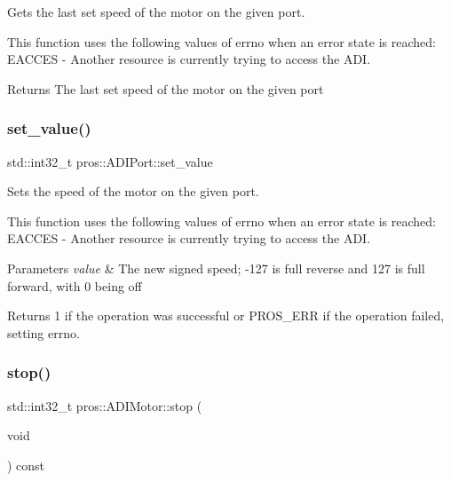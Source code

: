 Gets the last set speed of the motor on the given port. 

This function uses the following values of errno when an error state is reached\+: E\+A\+C\+C\+ES -\/ Another resource is currently trying to access the A\+DI.

\begin{DoxyReturn}{Returns}
The last set speed of the motor on the given port 
\end{DoxyReturn}
\mbox{\label{classpros_1_1ADIMotor_ae6711117fbceb3bb6e3602c4ef63aff1}} 
\subsubsection{\texorpdfstring{set\_value()}{set\_value()}}
{\footnotesize\ttfamily std\+::int32\+\_\+t pros\+::\+A\+D\+I\+Port\+::set\+\_\+value}



Sets the speed of the motor on the given port. 

This function uses the following values of errno when an error state is reached\+: E\+A\+C\+C\+ES -\/ Another resource is currently trying to access the A\+DI.


\begin{DoxyParams}{Parameters}
{\em value} & The new signed speed; -\/127 is full reverse and 127 is full forward, with 0 being off\\
\hline
\end{DoxyParams}
\begin{DoxyReturn}{Returns}
1 if the operation was successful or P\+R\+O\+S\+\_\+\+E\+RR if the operation failed, setting errno. 
\end{DoxyReturn}
\mbox{\label{classpros_1_1ADIMotor_ad8e9be8dfbc022e893a4d15996fe3bcd}} 
\subsubsection{\texorpdfstring{stop()}{stop()}}
{\footnotesize\ttfamily std\+::int32\+\_\+t pros\+::\+A\+D\+I\+Motor\+::stop (\begin{DoxyParamCaption}\item[{void}]{ }\end{DoxyParamCaption}) const}



